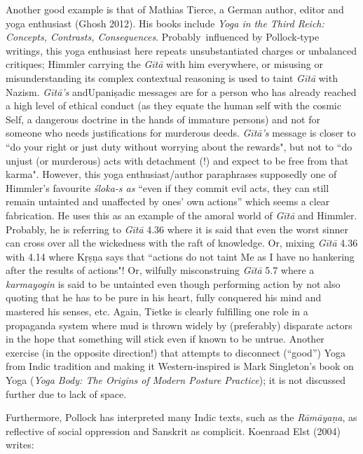 Another good example is that of Mathias Tierce, a German author, editor and yoga enthusiast (Ghosh 2012). His books include {\sl Yoga in the Third Reich: Concepts, Contrasts, Consequences}. Probably~influenced by Pollock-type writings, this yoga enthusiast here repeats unsubstantiated charges or unbalanced critiques; Himmler carrying the {\sl Gītā} with him everywhere, or misusing or misunderstanding its complex contextual reasoning is used to taint {\sl Gītā} with Nazism. {\sl Gītā's} and\break Upaniṣadic messages are for a person who has already reached a high level of ethical conduct (as they equate the human self with the cosmic Self, a dangerous doctrine in the hands of immature persons) and not for someone who needs justifications for murderous deeds. {\sl Gītā's} message is closer to ``do your right or just duty without worrying about the rewards", but not to ``do unjust (or murderous) acts with detachment (!) and expect to be free from that karma". However, this yoga enthusiast/author paraphrases supposedly one of Himmler's favourite {\sl śloka-s as} ``even if they commit evil acts, they can still remain untainted and unaffected by ones' own actions” which seems a clear fabrication. He uses this as an example of the amoral world of {\sl Gītā} and Himmler. Probably, he is referring to {\sl Gītā} 4.36 where it is said that even the worst sinner can cross over all the wickedness with the raft of knowledge. Or, mixing {\sl Gītā} 4.36 with 4.14 where Kṛṣṇa says that ``actions do not taint Me as I have no hankering after the results of actions"! Or, wilfully misconstruing {\sl Gītā} 5.7 where a {\sl karmayogin} is said to be untainted even though performing action by not also quoting that he has to be pure in his heart, fully conquered his mind and mastered his senses, etc. Again, Tietke is clearly fulfilling one role in a propaganda system where mud is thrown widely by (preferably) disparate actors in the hope that something will stick even if known to be untrue. Another exercise (in the opposite direction!) that attempts to disconnect (“good”) Yoga from Indic tradition and making it Western-inspired is Mark Singleton’s book on Yoga ({\sl Yoga Body: The Origins of Modern Posture Practice}); it is not discussed further due to lack of space.
\smallskip

Furthermore, Pollock has interpreted many Indic texts, such as the {\sl Rāmāyaṇa}, as reflective of social oppression and Sanskrit as complicit. Koenraad Elst (2004) writes: 
\smallskip

